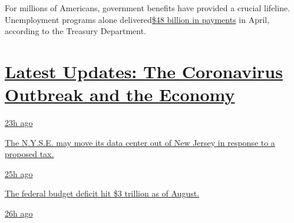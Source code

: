 For millions of Americans, government benefits have provided a crucial
lifeline. Unemployment programs alone
delivered\href{https://fsapps.fiscal.treasury.gov/dts/files/20043000.pdf}{\$48
billion in payments} in April, according to the Treasury Department.

\hypertarget{latest-updates-the-coronavirus-outbreak-and-the-economy}{%
\section{\texorpdfstring{\href{https://www.nytimes3xbfgragh.onion/live/2020/09/11/business/stock-market-today-coronavirus?action=click\&pgtype=Article\&state=default\&region=MAIN_CONTENT_1\&context=storylines_live_updates}{Latest
Updates: The Coronavirus Outbreak and the
Economy}}{Latest Updates: The Coronavirus Outbreak and the Economy}}\label{latest-updates-the-coronavirus-outbreak-and-the-economy}}

\href{https://www.nytimes3xbfgragh.onion/live/2020/09/11/business/stock-market-today-coronavirus?action=click\&pgtype=Article\&state=default\&region=MAIN_CONTENT_1\&context=storylines_live_updates\#the-nyse-may-move-its-data-center-out-of-new-jersey-in-response-to-a-proposed-tax}{23h
ago}

\href{https://www.nytimes3xbfgragh.onion/live/2020/09/11/business/stock-market-today-coronavirus?action=click\&pgtype=Article\&state=default\&region=MAIN_CONTENT_1\&context=storylines_live_updates\#the-nyse-may-move-its-data-center-out-of-new-jersey-in-response-to-a-proposed-tax}{The
N.Y.S.E. may move its data center out of New Jersey in response to a
proposed tax.}

\href{https://www.nytimes3xbfgragh.onion/live/2020/09/11/business/stock-market-today-coronavirus?action=click\&pgtype=Article\&state=default\&region=MAIN_CONTENT_1\&context=storylines_live_updates\#the-federal-budget-deficit-hit-3-trillion-as-of-august}{25h
ago}

\href{https://www.nytimes3xbfgragh.onion/live/2020/09/11/business/stock-market-today-coronavirus?action=click\&pgtype=Article\&state=default\&region=MAIN_CONTENT_1\&context=storylines_live_updates\#the-federal-budget-deficit-hit-3-trillion-as-of-august}{The
federal budget deficit hit \$3 trillion as of August.}

\href{https://www.nytimes3xbfgragh.onion/live/2020/09/11/business/stock-market-today-coronavirus?action=click\&pgtype=Article\&state=default\&region=MAIN_CONTENT_1\&context=storylines_live_updates\#warner-bros-pushes-the-release-of-wonder-woman-1984-to-christmas}{26h
ago}

